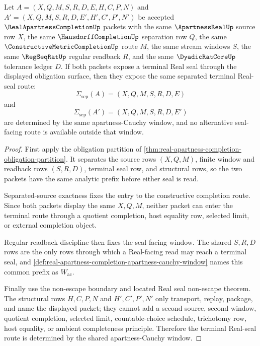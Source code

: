 \begin{theorem}
\label{thm:real-apartness-completion-separated-seal-determinacy}
Let $A=(X,Q,M,S,R,D,E,H,C,P,N)$ and $A'=(X,Q,M,S,R,D,E',H',C',P',N')$ be accepted $\RealApartnessCompletionUp$ packets with the same $\ApartnessRealUp$ source row $X$, the same $\HausdorffCompletionUp$ separation row $Q$, the same $\ConstructiveMetricCompletionUp$ route $M$, the same stream windows $S$, the same $\RegSeqRatUp$ regular readback $R$, and the same $\DyadicRatCoreUp$ tolerance ledger $D$. If both packets expose a terminal Real seal through the displayed obligation surface, then they expose the same separated terminal Real-seal route:
$$
\Sigma_{\mathrm{sep}}(A)=(X,Q,M,S,R,D,E)
$$
and
$$
\Sigma_{\mathrm{sep}}(A')=(X,Q,M,S,R,D,E')
$$
are determined by the same apartness-Cauchy window, and no alternative seal-facing route is available outside that window.
\end{theorem}
\begin{proof}
First apply the obligation partition of \autoref{thm:real-apartness-completion-obligation-partition}. It separates the source rows $(X,Q,M)$, finite window and readback rows $(S,R,D)$, terminal seal row, and structural rows, so the two packets have the same analytic prefix before either seal is read.

Separated-source exactness fixes the entry to the constructive completion route. Since both packets display the same $X,Q,M$, neither packet can enter the terminal route through a quotient completion, host equality row, selected limit, or external completion object.

Regular readback discipline then fixes the seal-facing window. The shared $S,R,D$ rows are the only rows through which a Real-facing read may reach a terminal seal, and \autoref{def:real-apartness-completion-apartness-cauchy-window} names this common prefix as $W_{\mathrm{ac}}$.

Finally use the non-escape boundary and located Real seal non-escape theorem. The structural rows $H,C,P,N$ and $H',C',P',N'$ only transport, replay, package, and name the displayed packet; they cannot add a second source, second window, quotient completion, selected limit, countable-choice schedule, trichotomy row, host equality, or ambient completeness principle. Therefore the terminal Real-seal route is determined by the shared apartness-Cauchy window.
\end{proof}

